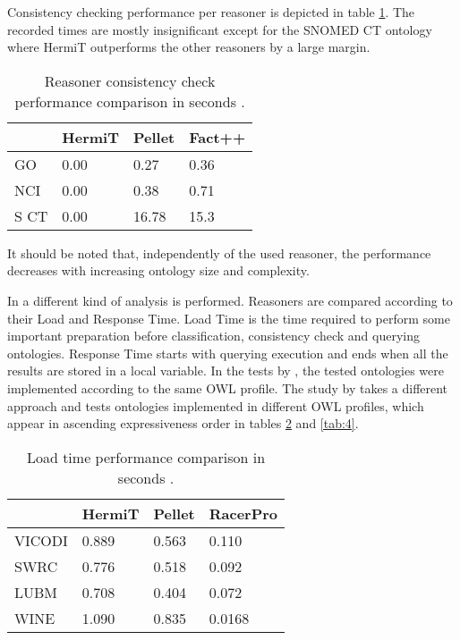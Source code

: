 Consistency checking performance per reasoner is depicted in table \ref{tab:2}. The recorded times are mostly insignificant except for the SNOMED CT ontology where HermiT outperforms the other reasoners by a large margin.

\begin{table}[]
\centering
\caption{Reasoner consistency check performance comparison in seconds \cite{Dentler2011}.}
\begin{tabular}{|l|l|l|l|}
\hline
      &  HermiT  &  Pellet   &  Fact++ \\ \hline
GO    &    0.00  &  0.27     &  0.36   \\ \hline
NCI   &    0.00  &  0.38     &  0.71   \\ \hline
S CT  &    0.00  &  16.78    &  15.3   \\ \hline
\end{tabular}
\label{tab:2}
\end{table}

It should be noted that, independently of the used reasoner, the performance decreases with increasing ontology size and complexity.

In \cite{Bock2008} a different kind of analysis is performed. Reasoners are compared according to their Load and Response Time.
Load Time is the time required to perform some important preparation before classification, consistency check and querying ontologies. Response Time starts with querying execution and ends when all the results are stored in a local variable. 
In the tests by \cite{Dentler2011}, the tested ontologies were implemented according to the same OWL profile. The study by \cite{Bock2008} takes a different approach and tests ontologies implemented in different OWL profiles, which appear in ascending expressiveness order in tables \ref{tab:3} and \ref{tab:4}. 

\begin{table}[]
\centering
\caption{Load time performance comparison in seconds \cite{Bock2008}.}
\begin{tabular}{|l|l|l|l|}
\hline
          &   HermiT  &  Pellet & RacerPro\\ \hline
VICODI    &    0.889  &  0.563  & 0.110   \\ \hline
SWRC      &    0.776  &  0.518  & 0.092   \\ \hline
LUBM      &    0.708  &  0.404  & 0.072   \\ \hline
WINE      &    1.090  &  0.835  & 0.0168  \\ \hline
\end{tabular}
\label{tab:3}
\end{table}

